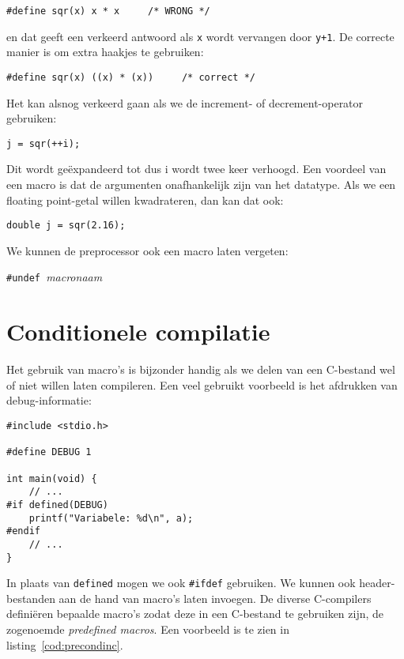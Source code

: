 \hspace*{1em}\texttt{\#define sqr(x) x * x \ \ \ \ /* WRONG */}

en dat geeft een verkeerd antwoord als \texttt{x} wordt vervangen door \texttt{y+1}. De correcte manier is om extra haakjes te gebruiken:

\hspace*{1em}\texttt{\#define sqr(x) ((x) * (x)) \ \ \ \ /* correct */}

Het kan alsnog verkeerd gaan als we de increment- of decrement-operator gebruiken:

\hspace*{1em}\texttt{j = sqr(++i);}

Dit wordt geëxpandeerd tot   dus i wordt twee keer verhoogd.
Een voordeel van een macro is dat de argumenten onafhankelijk zijn van het datatype. Als we een floating point-getal willen kwadrateren, dan kan dat ook:

\hspace*{1em}\texttt{double j = sqr(2.16);}

We kunnen de preprocessor ook een macro laten vergeten:

\hspace*{1em}\texttt{\#undef }\textsl{macronaam}


\section{Conditionele compilatie}
Het gebruik van macro's is bijzonder handig als we delen van een C-bestand wel of niet willen laten compileren. Een veel gebruikt voorbeeld is het afdrukken van debug-informatie:

\begin{lstlisting}[caption=Conditionele compilatie.]
#include <stdio.h>

#define DEBUG 1

int main(void) {
    // ...
#if defined(DEBUG)
    printf("Variabele: %d\n", a);
#endif
    // ...
}
\end{lstlisting}

In plaats van \texttt{defined} mogen we ook \texttt{\#ifdef} gebruiken. We kunnen ook header-bestanden aan de hand van macro's laten invoegen. De diverse C-compilers definiëren bepaalde macro's zodat deze in een C-bestand te gebruiken zijn, de zogenoemde \textsl{predefined macros}. Een voorbeeld is te zien in listing~\ref{cod:precondinc}.

